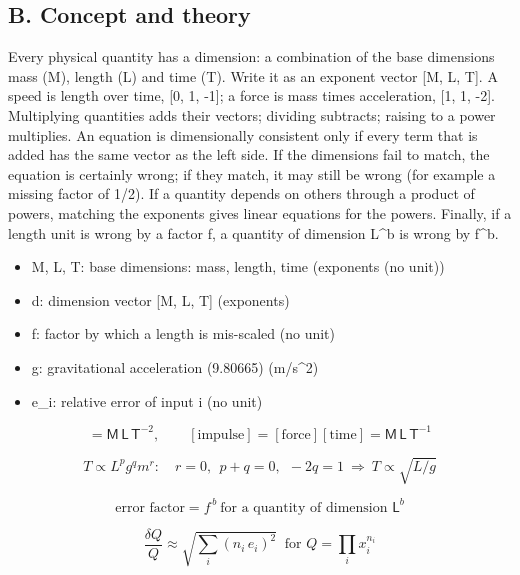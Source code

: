 \documentclass[11pt,a4paper]{article}
\begin{document}
\subsection*{B. Concept and theory}
Every physical quantity has a dimension: a combination of the base dimensions mass (M), length (L) and time (T). Write it as an exponent vector [M, L, T]. A speed is length over time, [0, 1, -1]; a force is mass times acceleration, [1, 1, -2]. Multiplying quantities adds their vectors; dividing subtracts; raising to a power multiplies. An equation is dimensionally consistent only if every term that is added has the same vector as the left side. If the dimensions fail to match, the equation is certainly wrong; if they match, it may still be wrong (for example a missing factor of 1/2). If a quantity depends on others through a product of powers, matching the exponents gives linear equations for the powers. Finally, if a length unit is wrong by a factor f, a quantity of dimension L\textasciicircum{}b is wrong by f\textasciicircum{}b.

\begin{itemize}[nosep]
\item M, L, T: base dimensions: mass, length, time (exponents (no unit))
\item d: dimension vector [M, L, T] (exponents)
\item f: factor by which a length is mis-scaled (no unit)
\item g: gravitational acceleration (9.80665) (m/s\textasciicircum{}2)
\item e\_i: relative error of input i (no unit)
\end{itemize}

\begin{equation*}
[\text{force}]=\mathsf{M}\,\mathsf{L}\,\mathsf{T}^{-2},\qquad [\text{impulse}]=[\text{force}][\text{time}]=\mathsf{M}\,\mathsf{L}\,\mathsf{T}^{-1}
\end{equation*}

\begin{equation*}
T\propto L^{p}g^{q}m^{r}:\quad r=0,\ \ p+q=0,\ \ -2q=1\ \Rightarrow\ T\propto\sqrt{L/g}
\end{equation*}

\begin{equation*}
\text{error factor}=f^{\,b}\ \text{for a quantity of dimension }\mathsf{L}^{b}
\end{equation*}

\begin{equation*}
\frac{\delta Q}{Q}\approx\sqrt{\sum_i\left(n_i\,e_i\right)^2}\ \text{ for }Q=\prod_i x_i^{n_i}
\end{equation*}
\end{document}
